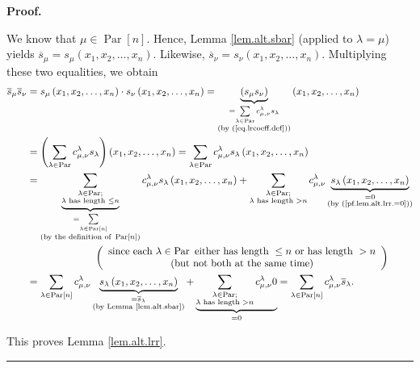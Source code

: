 \documentclass[numbers=enddot,12pt,final,onecolumn,notitlepage]{scrartcl}%
\theoremstyle{definition}
\newenvironment{proof}[1][Proof]{\noindent\textbf{#1.} }{\ \rule{0.5em}{0.5em}}
\let\sumnonlimits\sum
\renewcommand{\sum}{\sumnonlimits\limits}
\newenvironment{verlong}{}{}
\newenvironment{vershort}{}{}
\begin{document}
\begin{proof}
\begin{vershort}
\end{vershort}

\begin{verlong}
We know that $\mu\in\operatorname*{Par}\left[  n\right]  $. Hence, Lemma
\ref{lem.alt.sbar} (applied to $\lambda=\mu$) yields $\overline{s}_{\mu
}=s_{\mu}\left(  x_{1},x_{2},\ldots,x_{n}\right)  $. Likewise, $\overline
{s}_{\nu}=s_{\nu}\left(  x_{1},x_{2},\ldots,x_{n}\right)  $. Multiplying these
two equalities, we obtain%
\begin{align*}
\overline{s}_{\mu}\overline{s}_{\nu}  &  =s_{\mu}\left(  x_{1},x_{2}%
,\ldots,x_{n}\right)  \cdot s_{\nu}\left(  x_{1},x_{2},\ldots,x_{n}\right)
=\underbrace{\left(  s_{\mu}s_{\nu}\right)  }_{\substack{=\sum_{\lambda
\in\operatorname*{Par}}c_{\mu,\nu}^{\lambda}s_{\lambda}\\\text{(by
(\ref{eq.lrcoeff.def}))}}}\left(  x_{1},x_{2},\ldots,x_{n}\right) \\
&  =\left(  \sum_{\lambda\in\operatorname*{Par}}c_{\mu,\nu}^{\lambda
}s_{\lambda}\right)  \left(  x_{1},x_{2},\ldots,x_{n}\right)  =\sum
_{\lambda\in\operatorname*{Par}}c_{\mu,\nu}^{\lambda}s_{\lambda}\left(
x_{1},x_{2},\ldots,x_{n}\right) \\
&  =\underbrace{\sum_{\substack{\lambda\in\operatorname*{Par};\\\lambda\text{
has length }\leq n}}}_{\substack{=\sum_{\lambda\in\operatorname*{Par}\left[
n\right]  }\\\text{(by the definition of }\operatorname*{Par}\left[  n\right]
\text{)}}}c_{\mu,\nu}^{\lambda}s_{\lambda}\left(  x_{1},x_{2},\ldots
,x_{n}\right)  +\sum_{\substack{\lambda\in\operatorname*{Par};\\\lambda\text{
has length }>n}}c_{\mu,\nu}^{\lambda}\underbrace{s_{\lambda}\left(
x_{1},x_{2},\ldots,x_{n}\right)  }_{\substack{=0\\\text{(by
(\ref{pf.lem.alt.lrr.=0}))}}}\\
&  \ \ \ \ \ \ \ \ \ \ \ \ \ \ \ \ \ \ \ \ \left(
\begin{array}
[c]{c}%
\text{since each }\lambda\in\operatorname*{Par}\text{ either has length }\leq
n\text{ or has length }>n\\
\text{(but not both at the same time)}%
\end{array}
\right) \\
&  =\sum_{\lambda\in\operatorname*{Par}\left[  n\right]  }c_{\mu,\nu}%
^{\lambda}\underbrace{s_{\lambda}\left(  x_{1},x_{2},\ldots,x_{n}\right)
}_{\substack{=\overline{s}_{\lambda}\\\text{(by Lemma \ref{lem.alt.sbar})}%
}}+\underbrace{\sum_{\substack{\lambda\in\operatorname*{Par};\\\lambda\text{
has length }>n}}c_{\mu,\nu}^{\lambda}0}_{=0}=\sum_{\lambda\in
\operatorname*{Par}\left[  n\right]  }c_{\mu,\nu}^{\lambda}\overline
{s}_{\lambda}.
\end{align*}

\end{verlong}

\noindent This proves Lemma \ref{lem.alt.lrr}.
\end{proof}
\end{document}
